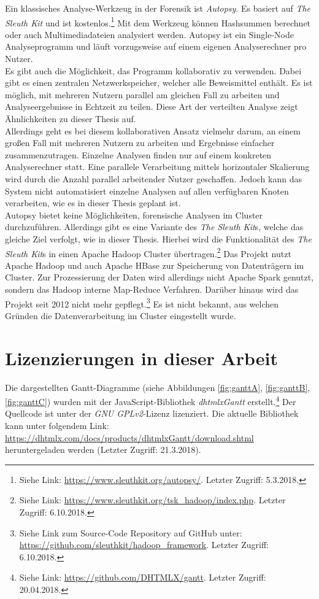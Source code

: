 \noindent
Ein klassisches Analyse-Werkzeug in der Forensik ist \textit{Autopsy}. Es basiert auf \textit{The Sleuth Kit} und ist kostenlos.\footnote{Siehe Link: \url{https://www.sleuthkit.org/autopsy/}. Letzter Zugriff: 5.3.2018.} Mit dem Werkzeug können Hashsummen berechnet oder auch Multimediadateien analysiert werden. Autopsy ist ein Single-Node Analyseprogramm und läuft vorzugsweise auf einem eigenen Analyserechner pro Nutzer.\\ 
Es gibt auch die Möglichkeit, das Programm kollaborativ zu verwenden. Dabei gibt es einen zentralen Netzwerkspeicher, welcher alle Beweismittel enthält. Es ist möglich, mit mehreren Nutzern parallel am gleichen Fall zu arbeiten und Analyseergebnisse in Echtzeit zu teilen. Diese Art der verteilten Analyse zeigt Ähnlichkeiten zu dieser Thesis auf.\\
Allerdings geht es bei diesem kollaborativen Ansatz vielmehr darum, an einem großen Fall mit mehreren Nutzern zu arbeiten und Ergebnisse einfacher zusammenzutragen. Einzelne Analysen finden nur auf einem konkreten Analyserechner statt. Eine parallele Verarbeitung mittels horizontaler Skalierung wird durch die Anzahl parallel arbeitender Nutzer geschaffen. Jedoch kann das System nicht automatisiert einzelne Analysen auf allen verfügbaren Knoten verarbeiten, wie es in dieser Thesis geplant ist.\\

\noindent
Autopsy bietet keine Möglichkeiten, forensische Analysen im Cluster durchzuführen. Allerdings gibt es eine Variante des \textit{The Sleuth Kit}s, welche das gleiche Ziel verfolgt, wie in dieser Thesis. Hierbei wird die Funktionalität des \textit{The Sleuth Kit}s in einen Apache Hadoop Cluster übertragen.\footnote{Siehe Link: \url{https://www.sleuthkit.org/tsk_hadoop/index.php}. Letzter Zugriff: 6.10.2018.} Das Projekt nutzt Apache Hadoop und auch Apache HBase zur Speicherung von Datenträgern im Cluster. Zur Prozessierung der Daten wird allerdings nicht Apache Spark genutzt, sondern das Hadoop interne Map-Reduce Verfahren. Darüber hinaus wird das Projekt seit 2012 nicht mehr gepflegt.\footnote{Siehe Link zum Source-Code Repository auf GitHub unter: \url{https://github.com/sleuthkit/hadoop_framework}. Letzter Zugriff: 6.10.2018.} Es ist nicht bekannt, aus welchen Gründen die Datenverarbeitung im Cluster eingestellt wurde.

\section{Lizenzierungen in dieser Arbeit}
\label{sec:licencing_issues}
Die dargestellten Gantt-Diagramme (siehe Abbildungen \ref{fig:ganttA}, \ref{fig:ganttB}, \ref{fig:ganttC}) wurden mit der JavaScript-Bibliothek \textit{dhtmlxGantt} erstellt.\footnote{Siehe Link: \url{https://github.com/DHTMLX/gantt}. Letzter Zugriff: 20.04.2018.} Der Quellcode ist unter der \textit{GNU GPLv2}-Lizenz lizenziert. Die aktuelle Bibliothek kann unter folgendem Link: \url{https://dhtmlx.com/docs/products/dhtmlxGantt/download.shtml} heruntergeladen werden (Letzter Zugriff: 21.3.2018).\\


